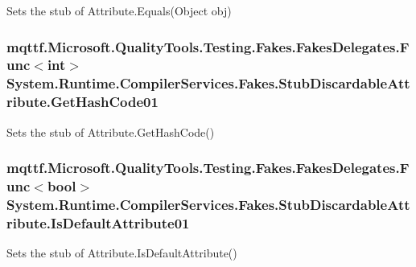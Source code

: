 Sets the stub of Attribute.\-Equals(\-Object obj)

\hypertarget{class_system_1_1_runtime_1_1_compiler_services_1_1_fakes_1_1_stub_discardable_attribute_a662519b3a0842e4d223181526f9c0d61}{
\subsubsection[{Get\-Hash\-Code01}]{\setlength{\rightskip}{0pt plus 5cm}mqttf.\-Microsoft.\-Quality\-Tools.\-Testing.\-Fakes.\-Fakes\-Delegates.\-Func$<$int$>$ System.\-Runtime.\-Compiler\-Services.\-Fakes.\-Stub\-Discardable\-Attribute.\-Get\-Hash\-Code01}}\label{class_system_1_1_runtime_1_1_compiler_services_1_1_fakes_1_1_stub_discardable_attribute_a662519b3a0842e4d223181526f9c0d61}


Sets the stub of Attribute.\-Get\-Hash\-Code()

\hypertarget{class_system_1_1_runtime_1_1_compiler_services_1_1_fakes_1_1_stub_discardable_attribute_a4614f6b8715d3a3f088a6abcfc3f32cf}{
\subsubsection[{Is\-Default\-Attribute01}]{\setlength{\rightskip}{0pt plus 5cm}mqttf.\-Microsoft.\-Quality\-Tools.\-Testing.\-Fakes.\-Fakes\-Delegates.\-Func$<$bool$>$ System.\-Runtime.\-Compiler\-Services.\-Fakes.\-Stub\-Discardable\-Attribute.\-Is\-Default\-Attribute01}}\label{class_system_1_1_runtime_1_1_compiler_services_1_1_fakes_1_1_stub_discardable_attribute_a4614f6b8715d3a3f088a6abcfc3f32cf}


Sets the stub of Attribute.\-Is\-Default\-Attribute()


